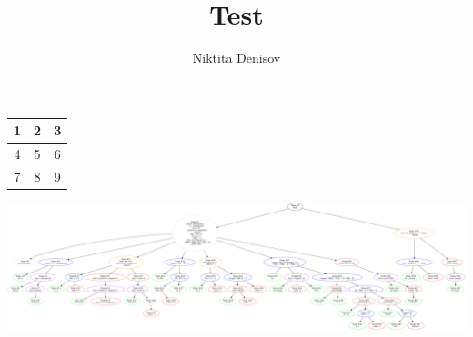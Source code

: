\documentclass{article}
\title{Test}
\author{Niktita Denisov}
\begin{document}
\maketitle
\begin{center}
\begin{tabular}{|c|c|c|}
\hline
1 & 2 & 3\\
\hline
4 & 5 & 6\\
\hline
7 & 8 & 9\\
\hline
\end{tabular}
\end{center}
\begin{center}
\includegraphics[width=20cm]{fibonacci_ast}
\end{center}
\end{document}

